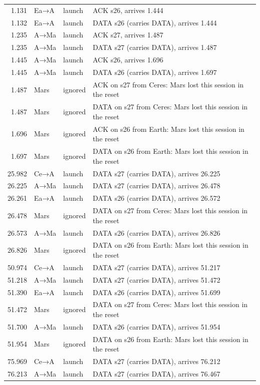 \documentclass[10pt,letterpaper]{article}
\begin{document}
{\begin{longtable}{@{}rll>{\raggedright\arraybackslash}p{8.2cm}@{}}
1.131 & Ea→A & launch & ACK s26, arrives 1.444 \\
1.132 & Ea→A & launch & DATA s26 (carries DATA), arrives 1.444 \\
1.235 & A→Ma & launch & ACK s27, arrives 1.487 \\
1.235 & A→Ma & launch & DATA s27 (carries DATA), arrives 1.487 \\
1.445 & A→Ma & launch & ACK s26, arrives 1.696 \\
1.445 & A→Ma & launch & DATA s26 (carries DATA), arrives 1.697 \\
1.487 & Mars & ignored & ACK on s27 from Ceres: Mars lost this session in the reset \\
1.487 & Mars & ignored & DATA on s27 from Ceres: Mars lost this session in the reset \\
1.696 & Mars & ignored & ACK on s26 from Earth: Mars lost this session in the reset \\
1.697 & Mars & ignored & DATA on s26 from Earth: Mars lost this session in the reset \\
25.982 & Ce→A & launch & DATA s27 (carries DATA), arrives 26.225 \\
26.225 & A→Ma & launch & DATA s27 (carries DATA), arrives 26.478 \\
26.261 & Ea→A & launch & DATA s26 (carries DATA), arrives 26.572 \\
26.478 & Mars & ignored & DATA on s27 from Ceres: Mars lost this session in the reset \\
26.573 & A→Ma & launch & DATA s26 (carries DATA), arrives 26.826 \\
26.826 & Mars & ignored & DATA on s26 from Earth: Mars lost this session in the reset \\
50.974 & Ce→A & launch & DATA s27 (carries DATA), arrives 51.217 \\
51.218 & A→Ma & launch & DATA s27 (carries DATA), arrives 51.472 \\
51.390 & Ea→A & launch & DATA s26 (carries DATA), arrives 51.699 \\
51.472 & Mars & ignored & DATA on s27 from Ceres: Mars lost this session in the reset \\
51.700 & A→Ma & launch & DATA s26 (carries DATA), arrives 51.954 \\
51.954 & Mars & ignored & DATA on s26 from Earth: Mars lost this session in the reset \\
75.969 & Ce→A & launch & DATA s27 (carries DATA), arrives 76.212 \\
76.213 & A→Ma & launch & DATA s27 (carries DATA), arrives 76.467 \\

\end{longtable}}
\end{document}
